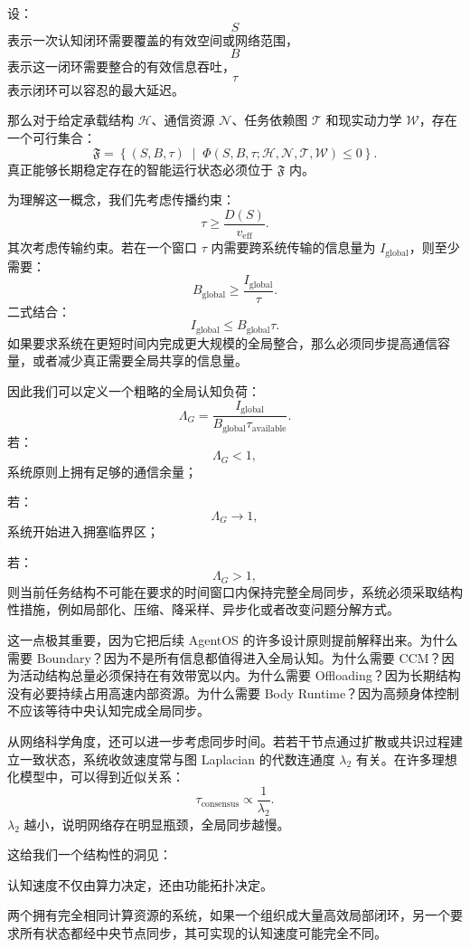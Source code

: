 设：
\[
S
\]
表示一次认知闭环需要覆盖的有效空间或网络范围，
\[
B
\]
表示这一闭环需要整合的有效信息吞吐，
\[
\tau
\]
表示闭环可以容忍的最大延迟。

那么对于给定承载结构 $\mathcal H$、通信资源 $\mathcal N$、任务依赖图 $\mathcal T$ 和现实动力学 $\mathcal W$，存在一个可行集合：
\[
\boxed{
\mathfrak F
=
\left\{
(S,B,\tau)
\;\middle|\;
\Phi(S,B,\tau;
\mathcal H,\mathcal N,\mathcal T,\mathcal W)
\leq0
\right\}.
}
\]
真正能够长期稳定存在的智能运行状态必须位于 $\mathfrak F$ 内。

为理解这一概念，我们先考虑传播约束：
\[
\tau
\geq
\frac{D(S)}{v_{\mathrm{eff}}}.
\]
其次考虑传输约束。若在一个窗口 $\tau$ 内需要跨系统传输的信息量为 $I_{\mathrm{global}}$，则至少需要：
\[
B_{\mathrm{global}}
\geq
\frac{I_{\mathrm{global}}}{\tau}.
\]
二式结合：
\[
I_{\mathrm{global}}
\leq
B_{\mathrm{global}}\tau.
\]
如果要求系统在更短时间内完成更大规模的全局整合，那么必须同步提高通信容量，或者减少真正需要全局共享的信息量。

因此我们可以定义一个粗略的全局认知负荷：
\[
\Lambda_G
=
\frac{
I_{\mathrm{global}}
}{
B_{\mathrm{global}}\tau_{\mathrm{available}}
}.
\]
若：
\[
\Lambda_G<1,
\]
系统原则上拥有足够的通信余量；

若：
\[
\Lambda_G\rightarrow1,
\]
系统开始进入拥塞临界区；

若：
\[
\Lambda_G>1,
\]
则当前任务结构不可能在要求的时间窗口内保持完整全局同步，系统必须采取结构性措施，例如局部化、压缩、降采样、异步化或者改变问题分解方式。

这一点极其重要，因为它把后续 AgentOS 的许多设计原则提前解释出来。为什么需要 Boundary？因为不是所有信息都值得进入全局认知。为什么需要 CCM？因为活动结构总量必须保持在有效带宽以内。为什么需要 Offloading？因为长期结构没有必要持续占用高速内部资源。为什么需要 Body Runtime？因为高频身体控制不应该等待中央认知完成全局同步。

从网络科学角度，还可以进一步考虑同步时间。若若干节点通过扩散或共识过程建立一致状态，系统收敛速度常与图 Laplacian 的代数连通度 $\lambda_2$ 有关。在许多理想化模型中，可以得到近似关系：
\[
\tau_{\mathrm{consensus}}
\propto
\frac{1}{\lambda_2}.
\]
$\lambda_2$ 越小，说明网络存在明显瓶颈，全局同步越慢。

这给我们一个结构性的洞见：

\begin{statementbox}
认知速度不仅由算力决定，还由功能拓扑决定。
\end{statementbox}

两个拥有完全相同计算资源的系统，如果一个组织成大量高效局部闭环，另一个要求所有状态都经中央节点同步，其可实现的认知速度可能完全不同。

